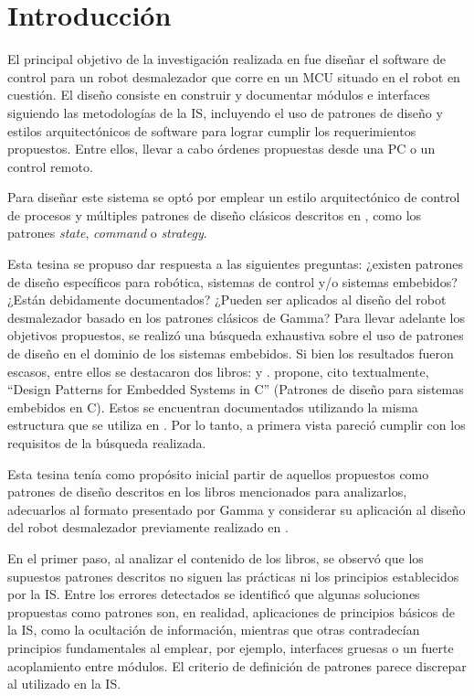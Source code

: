 \chapter{Introducción}

El principal objetivo de la investigación realizada en \cite{paperPomponio} fue diseñar el software de control para un robot desmalezador que corre en un \gls{MCU} situado en el robot en cuestión. El diseño consiste en construir y documentar módulos e interfaces siguiendo las metodologías de la \gls{IS}, incluyendo el uso de patrones de diseño y estilos arquitectónicos de software para lograr cumplir los requerimientos propuestos. Entre ellos, llevar a cabo órdenes propuestas desde una PC o un control remoto.

Para diseñar este sistema se optó por emplear un estilo arquitectónico de control de procesos \cite[pág. 27]{ShawGarlan1996} y múltiples patrones de diseño clásicos descritos en \cite{Gamma:1995:DPE:186897}, como los patrones \textit{state}, \textit{command} o \textit{strategy}.

Esta tesina se propuso dar respuesta a las siguientes preguntas: ¿existen patrones de diseño específicos para robótica, sistemas de control y/o sistemas embebidos? ¿Están debidamente documentados? ¿Pueden ser aplicados al diseño del robot desmalezador basado en los patrones clásicos de Gamma? Para llevar adelante los objetivos propuestos, se realizó una búsqueda exhaustiva sobre el uso de patrones de diseño en el dominio de los sistemas embebidos. Si bien los resultados fueron escasos,  entre ellos se destacaron dos libros: \cite{douglass} y \cite{elecia}. \cite{douglass} propone, cito textualmente, ``Design Patterns for Embedded Systems in C'' (Patrones de diseño para sistemas embebidos en C). Estos se encuentran documentados utilizando la misma estructura que se utiliza en \cite{Gamma:1995:DPE:186897}. Por lo tanto, a primera vista pareció cumplir con los requisitos de la búsqueda realizada.

Esta tesina tenía como propósito inicial partir de aquellos propuestos como patrones de diseño descritos en los libros mencionados para analizarlos, adecuarlos al formato presentado por Gamma \cite{Gamma:1995:DPE:186897} y considerar su aplicación al diseño del robot desmalezador previamente realizado en \cite{paperPomponio}.

En el primer paso, al analizar el contenido de los libros, se observó que los supuestos patrones descritos no siguen las prácticas ni los principios establecidos por la \gls{IS}. Entre los errores detectados se identificó que algunas soluciones propuestas como patrones son, en realidad, aplicaciones de principios básicos de la \gls{IS}, como la ocultación de información, mientras que otras contradecían principios fundamentales al emplear, por ejemplo, interfaces gruesas o un fuerte acoplamiento entre módulos. El criterio de definición de patrones parece discrepar al utilizado en la \gls{IS}.

